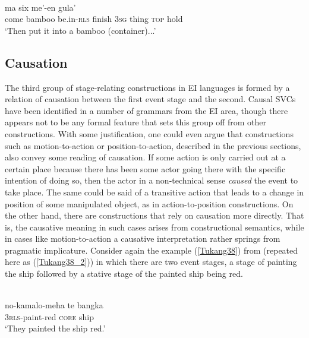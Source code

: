 \ea \label{Teiwa_xy}
\\
\gll ma six me'-en gula' \\
come bamboo be.in-\textsc{rls} finish 3\textsc{sg} thing \textsc{top} hold \\
\glft `Then put it into a bamboo (container)...'\\ 
\z

\subsection{Causation} \label{sec:causation}

The third group of stage-relating constructions in EI languages is formed by a relation of causation between the first event stage and the second. Causal SVCs have been identified in a number of grammars from the EI area, though there appears not to be any formal feature that sets this group off from other constructions. With some justification, one could even argue that constructions such as motion-to-action or position-to-action, described in the previous sections, also convey some reading of causation. If some action is only carried out at a certain place because there has been some actor going there with the specific intention of doing so, then the actor in a non-technical sense \textit{caused} the event to take place. The same could be said of a transitive action that leads to a change in position of some manipulated object, as in action-to-position constructions. On the other hand, there are constructions that rely on causation more directly. That is, the causative  meaning in such cases arises from constructional semantics, while in cases like motion-to-action a causative interpretation rather springs from pragmatic implicature. Consider again the  example (\ref{Tukang38}) from  (repeated here as (\ref{Tukang38_2})) in which there are two event stages, a stage of painting the ship followed by a stative stage of the painted ship being red.

\ea \label{Tukang38_2}
\\
\gll no-kamalo-meha te bangka \\
3\textsc{rls}-paint-red \textsc{core} ship \\
\glft `They painted the ship red.'\\ 
\z

